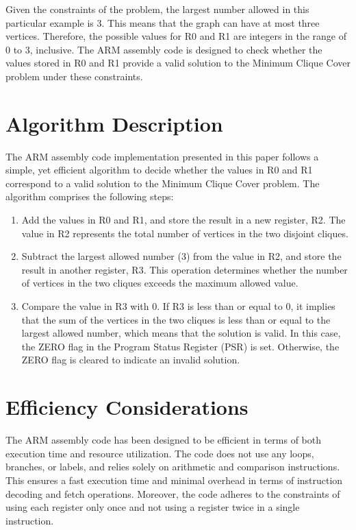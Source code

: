 Given the constraints of the problem, the largest number allowed in this particular example is 3. This means that the graph can have at most three vertices. Therefore, the possible values for R0 and R1 are integers in the range of 0 to 3, inclusive. The ARM assembly code is designed to check whether the values stored in R0 and R1 provide a valid solution to the Minimum Clique Cover problem under these constraints.

\section{Algorithm Description}

The ARM assembly code implementation presented in this paper follows a simple, yet efficient algorithm to decide whether the values in R0 and R1 correspond to a valid solution to the Minimum Clique Cover problem. The algorithm comprises the following steps:

\begin{enumerate}
    \item Add the values in R0 and R1, and store the result in a new register, R2. The value in R2 represents the total number of vertices in the two disjoint cliques.
    \item Subtract the largest allowed number (3) from the value in R2, and store the result in another register, R3. This operation determines whether the number of vertices in the two cliques exceeds the maximum allowed value.
    \item Compare the value in R3 with 0. If R3 is less than or equal to 0, it implies that the sum of the vertices in the two cliques is less than or equal to the largest allowed number, which means that the solution is valid. In this case, the ZERO flag in the Program Status Register (PSR) is set. Otherwise, the ZERO flag is cleared to indicate an invalid solution.
\end{enumerate}

\section{Efficiency Considerations}

The ARM assembly code has been designed to be efficient in terms of both execution time and resource utilization. The code does not use any loops, branches, or labels, and relies solely on arithmetic and comparison instructions. This ensures a fast execution time and minimal overhead in terms of instruction decoding and fetch operations. Moreover, the code adheres to the constraints of using each register only once and not using a register twice in a single instruction.

